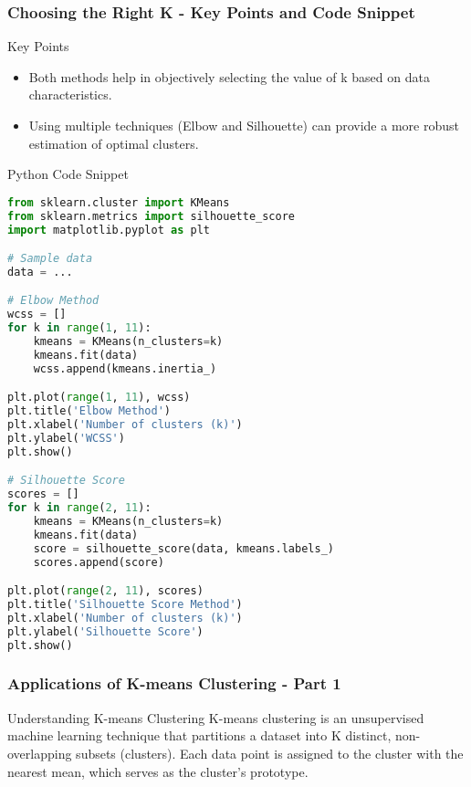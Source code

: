 \documentclass[aspectratio=169]{beamer}
\begin{document}
\begin{frame}[fragile]
    \frametitle{Choosing the Right K - Key Points and Code Snippet}
    \begin{block}{Key Points}
        \begin{itemize}
            \item Both methods help in objectively selecting the value of k based on data characteristics.
            \item Using multiple techniques (Elbow and Silhouette) can provide a more robust estimation of optimal clusters.
        \end{itemize}
    \end{block}
    
    \begin{block}{Python Code Snippet}
    \begin{lstlisting}[language=Python]
from sklearn.cluster import KMeans
from sklearn.metrics import silhouette_score
import matplotlib.pyplot as plt

# Sample data
data = ...

# Elbow Method
wcss = []
for k in range(1, 11):
    kmeans = KMeans(n_clusters=k)
    kmeans.fit(data)
    wcss.append(kmeans.inertia_)

plt.plot(range(1, 11), wcss)
plt.title('Elbow Method')
plt.xlabel('Number of clusters (k)')
plt.ylabel('WCSS')
plt.show()

# Silhouette Score
scores = []
for k in range(2, 11):
    kmeans = KMeans(n_clusters=k)
    kmeans.fit(data)
    score = silhouette_score(data, kmeans.labels_)
    scores.append(score)

plt.plot(range(2, 11), scores)
plt.title('Silhouette Score Method')
plt.xlabel('Number of clusters (k)')
plt.ylabel('Silhouette Score')
plt.show()
    \end{lstlisting}
    \end{block}
\end{frame}

\begin{frame}[fragile]
    \frametitle{Applications of K-means Clustering - Part 1}
    \begin{block}{Understanding K-means Clustering}
        K-means clustering is an unsupervised machine learning technique that partitions a dataset into K distinct, non-overlapping subsets (clusters). Each data point is assigned to the cluster with the nearest mean, which serves as the cluster's prototype.
    \end{block}
\end{frame}
\end{document}
